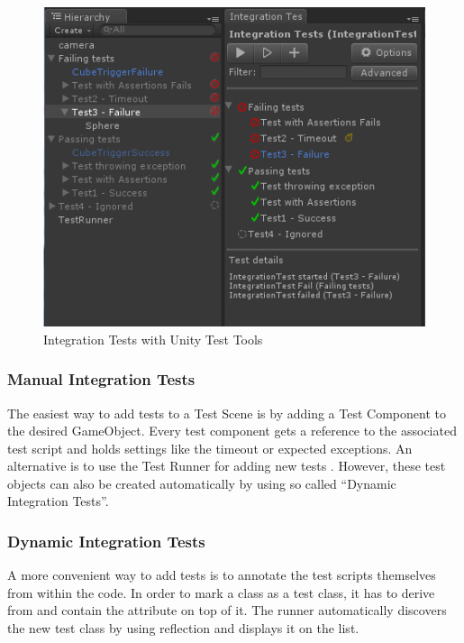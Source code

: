         \begin{figure}[hbtp]
            \centering
            \includegraphics[width=\columnwidth]{img/unityIntegrationTestExample.png}
            \caption{Integration Tests with Unity Test Tools}
            \label{fig:UnityIntTestExample}
        \end{figure}

        \subsubsection{Manual Integration Tests}
            The easiest way to add tests to a Test Scene is by adding a Test Component to the desired GameObject.
            Every test component gets a reference to the associated test script and holds settings like the timeout or expected exceptions.
            An alternative is to use the Test Runner for adding new tests .
            However, these test objects can also be created automatically by using so called ``Dynamic Integration Tests''.

        \subsubsection{Dynamic Integration Tests}
            A more convenient way to add tests is to annotate the test scripts themselves from within the code.
            In order to mark a class as a test class, it has to derive from  and contain the attribute
             on top of it.
            The runner automatically discovers the new test class by using reflection and displays it on the list.  

